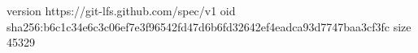 version https://git-lfs.github.com/spec/v1
oid sha256:b6c1c34e6c3c06ef7e3f96542fd47d6b6fd32642ef4eadca93d7747baa3cf3fc
size 45329
